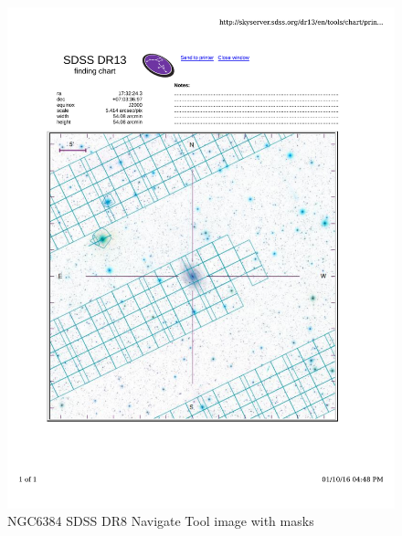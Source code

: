 \documentclass[10pt,letterpaper]{article}
\begin{document}
\begin{figure}[h!]
\centering
\includegraphics[scale=0.7]{figures/NGC6384.pdf}
\caption{NGC6384 SDSS DR8 Navigate Tool image with masks}
\end{figure}

\clearpage
\end{document}
